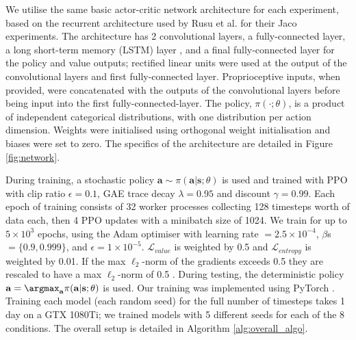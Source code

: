 We utilise the same basic actor-critic network architecture for each
experiment, based on the recurrent architecture used by Rusu et al.
\cite{rusu2017sim} for their Jaco experiments. The architecture has 2
convolutional layers, a fully-connected layer, a long short-term memory
(LSTM) layer \cite{gers2000learning, hochreiter1997long}, and a final
fully-connected layer for the policy and value outputs; rectified linear
units were used at the output of the convolutional layers and first
fully-connected layer. Proprioceptive inputs, when provided, were
concatenated with the outputs of the convolutional layers before being
input into the first fully-connected-layer. The policy,
\(\pi(\cdot; \theta)\), is a product of independent categorical
distributions, with one distribution per action dimension. Weights were
initialised using orthogonal weight initialisation
\cite{ilyas2018deep, saxe2014exact} and biases were set to zero. The
specifics of the architecture are detailed in Figure \ref{fig:network}.

During training, a stochastic policy
\(\mathbf{a} \sim \pi(\mathbf{a}|\mathbf{s}; \theta)\) is used and
trained with PPO with clip ratio \(\epsilon = 0.1\), GAE trace decay
\(\lambda = 0.95\) and discount \(\gamma = 0.99\). Each epoch of
training consists of 32 worker processes collecting 128 timesteps worth
of data each, then 4 PPO updates with a minibatch size of 1024. We train
for up to \(5 \times 10^3\) epochs, using the Adam optimiser
\cite{kingma2014adam} with learning rate \(= 2.5 \times 10^{-4}\),
\(\beta\)s \(= \{0.9, 0.999\}\), and \(\epsilon = 1 \times 10^{-5}\).
\(\mathcal{L}_{value}\) is weighted by 0.5 and \(\mathcal{L}_{entropy}\)
is weighted by 0.01. If the max \(\ell_2\)-norm of the gradients exceeds
0.5 they are rescaled to have a max \(\ell_2\)-norm of 0.5
\cite{pascanu2013difficulty}. During testing, the deterministic policy
\(\mathbf{a} = \argmax_\mathbf{a} \pi(\mathbf{a}|\mathbf{s}; \theta)\)
is used. Our training was implemented using PyTorch
\cite{paszke2019pytorch}. Training each model (each random seed) for
the full number of timesteps takes 1 day on a GTX 1080Ti; we trained
models with 5 different seeds for each of the 8 conditions. The overall
setup is detailed in Algorithm \ref{alg:overall_algo}.

